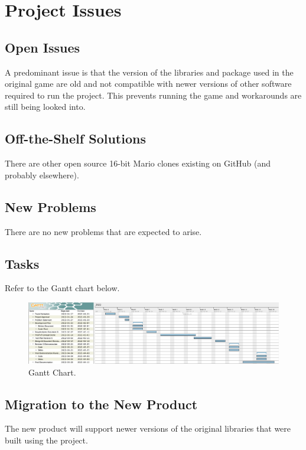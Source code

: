 \documentclass[12pt, titlepage]{article}
\begin{document}
\section{Project Issues}

\subsection{Open Issues}

A predominant issue is that the version of the libraries and package used in the original game are old and not compatible with newer versions of other software required to run the project. This prevents running the game and workarounds are still being looked into.


\subsection{Off-the-Shelf Solutions}

There are other open source 16-bit Mario clones existing on GitHub (and probably elsewhere).

\subsection{New Problems}

There are no new problems that are expected to arise.

\subsection{Tasks}
Refer to the Gantt chart below.
\begin{figure}[H]
    \centering
    \includegraphics[scale=0.3]{images/Screen Shot 2022-02-11 at 8.50.38 PM.png}
    \caption{Gantt Chart.}
    \label{fig:my_label}
\end{figure}

\subsection{Migration to the New Product}

The new product will support newer versions of the original libraries that were built using the project.
\end{document}
